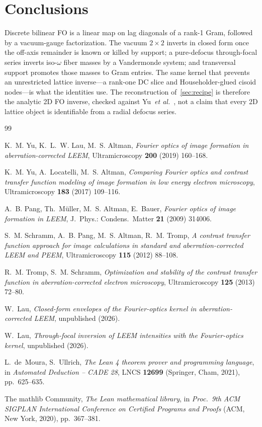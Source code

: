 \documentclass[11pt,a4paper]{article}
\theoremstyle{definition}
\theoremstyle{remark}
\begin{document}
\section{Conclusions}
\label{sec:end}

Discrete bilinear FO is a linear map on lag diagonals of a rank-1
Gram, followed by a vacuum-gauge factorization.
The vacuum $2\times 2$ inverts in closed form once the off-axis
remainder is known or killed by support; a pure-defocus through-focal
series inverts iso-$\omega$ fiber masses by a Vandermonde system; and
transversal support promotes those masses to Gram entries.
The same kernel that prevents an unrestricted lattice inverse---a
rank-one DC slice and Householder-glued cisoid nodes---is what the
identities use.
The reconstruction of~\cref{sec:recipe} is therefore the analytic 2D
FO inverse, checked against Yu~\emph{et al.}~\cite{Yu2019}, not a
claim that every 2D lattice object is identifiable from a radial
defocus series.

\begin{thebibliography}{99}

K.~M. Yu, K.~L.~W. Lau, M.~S. Altman,
\emph{Fourier optics of image formation in aberration-corrected LEEM},
Ultramicroscopy \textbf{200} (2019) 160--168.

K.~M. Yu, A.~Locatelli, M.~S. Altman,
\emph{Comparing Fourier optics and contrast transfer function modeling
of image formation in low energy electron microscopy},
Ultramicroscopy \textbf{183} (2017) 109--116.

A.~B. Pang, Th.~M\"uller, M.~S. Altman, E.~Bauer,
\emph{Fourier optics of image formation in LEEM},
J.\ Phys.: Condens.\ Matter \textbf{21} (2009) 314006.

S.~M. Schramm, A.~B. Pang, M.~S. Altman, R.~M. Tromp,
\emph{A contrast transfer function approach for image calculations
in standard and aberration-corrected LEEM and PEEM},
Ultramicroscopy \textbf{115} (2012) 88--108.

R.~M. Tromp, S.~M. Schramm,
\emph{Optimization and stability of the contrast transfer function
in aberration-corrected electron microscopy},
Ultramicroscopy \textbf{125} (2013) 72--80.

W.~Lau,
\emph{Closed-form envelopes of the Fourier-optics kernel in
aberration-corrected LEEM},
unpublished (2026).

W.~Lau,
\emph{Through-focal inversion of LEEM intensities with the
Fourier-optics kernel},
unpublished (2026).

L.~de~Moura, S.~Ullrich,
\emph{The Lean 4 theorem prover and programming language},
in \emph{Automated Deduction -- CADE 28},
LNCS \textbf{12699} (Springer, Cham, 2021), pp.~625--635.

The mathlib Community,
\emph{The Lean mathematical library},
in \emph{Proc.\ 9th ACM SIGPLAN International Conference on
Certified Programs and Proofs} (ACM, New York, 2020), pp.~367--381.

\end{thebibliography}
\end{document}
